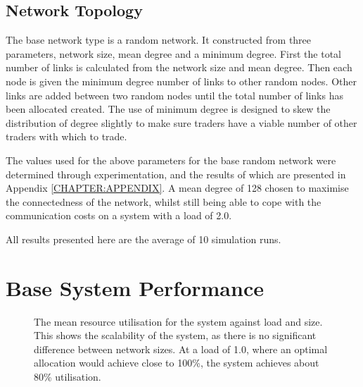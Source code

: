 \subsection{Network Topology}

The base network type is a random network. It constructed from three
parameters, network size, mean degree and a minimum degree. First the total
number of links is calculated from the network size and mean degree. Then each
node is given the minimum degree number of links to other random nodes. Other
links are added between two random nodes until the total number of links has
been allocated created. The use of minimum degree is designed to skew the
distribution of degree slightly to make sure traders have a viable number of
other traders with which to trade.

The values used for the above parameters for the base random network were
determined through experimentation, and the results of which are presented in
Appendix \ref{CHAPTER:APPENDIX}. A mean degree of 128 chosen to maximise the
connectedness of the network, whilst still being able to cope with the
communication costs on a system with a load of 2.0.

All results presented here are the average of 10 simulation runs.

\section{Base System Performance}

\begin{figure}[h] 
  \centering
  
  \caption{The mean resource utilisation for the system against load and size.
  This shows the scalability of the system, as there is no significant
  difference between network sizes. At a load of 1.0, where an optimal
  allocation would achieve close to 100\%, the system achieves about
  80\% utilisation.}

  \label{FIG:RES:RUTIL}
\end{figure}

